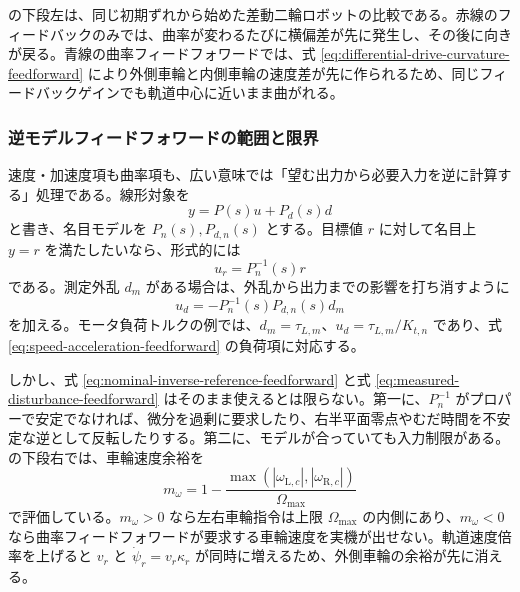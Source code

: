  の下段左は、同じ初期ずれから始めた差動二輪ロボットの比較である。赤線のフィードバックのみでは、曲率が変わるたびに横偏差が先に発生し、その後に向きが戻る。青線の曲率フィードフォワードでは、式 \eqref{eq:differential-drive-curvature-feedforward} により外側車輪と内側車輪の速度差が先に作られるため、同じフィードバックゲインでも軌道中心に近いまま曲がれる。

\subsubsection{逆モデルフィードフォワードの範囲と限界}

速度・加速度項も曲率項も、広い意味では「望む出力から必要入力を逆に計算する」処理である。線形対象を
\begin{equation}
  y=P(s)u+P_d(s)d
  \label{eq:inverse-model-feedforward-plant}
\end{equation}
と書き、名目モデルを $P_n(s),P_{d,n}(s)$ とする。目標値 $r$ に対して名目上 $y=r$ を満たしたいなら、形式的には
\begin{equation}
  u_r=P_n^{-1}(s)r
  \label{eq:nominal-inverse-reference-feedforward}
\end{equation}
である。測定外乱 $d_m$ がある場合は、外乱から出力までの影響を打ち消すように
\begin{equation}
  u_d=-P_n^{-1}(s)P_{d,n}(s)d_m
  \label{eq:measured-disturbance-feedforward}
\end{equation}
を加える。モータ負荷トルクの例では、$d_m=\tau_{L,m}$、$u_d=\tau_{L,m}/K_{t,n}$ であり、式 \eqref{eq:speed-acceleration-feedforward} の負荷項に対応する。

しかし、式 \eqref{eq:nominal-inverse-reference-feedforward} と式 \eqref{eq:measured-disturbance-feedforward} はそのまま使えるとは限らない。第一に、$P_n^{-1}$ がプロパーで安定でなければ、微分を過剰に要求したり、右半平面零点やむだ時間を不安定な逆として反転したりする。第二に、モデルが合っていても入力制限がある。 の下段右では、車輪速度余裕を
\begin{equation}
  m_\omega
  =
  1-
  \frac{
    \max(|\omega_{\mathrm{L},c}|,|\omega_{\mathrm{R},c}|)
  }{\Omega_{\max}}
  \label{eq:wheel-speed-margin-feedforward}
\end{equation}
で評価している。$m_\omega>0$ なら左右車輪指令は上限 $\Omega_{\max}$ の内側にあり、$m_\omega<0$ なら曲率フィードフォワードが要求する車輪速度を実機が出せない。軌道速度倍率を上げると $v_r$ と $\dot{\psi}_r=v_r\kappa_r$ が同時に増えるため、外側車輪の余裕が先に消える。

